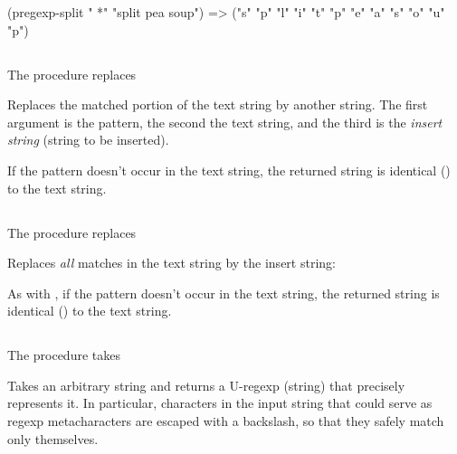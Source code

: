 {{(pregexp-split " *" "split pea     soup")
=> ("s" "p" "l" "i" "t" "p" "e" "a" "s" "o" "u" "p")
}

\subsection{}

\ifx\MzLibManual\Undefined
The procedure  replaces 
\else


Replaces
\fi
the
matched portion of the text string by another
string.  The first argument is the pattern,
the second the text string, and the third
is the {\em insert string} (string to be inserted).


\n If the pattern doesn't occur in the text 
string, the returned string is identical ()
to the text string.

\subsection{}

\ifx\MzLibManual\Undefined
The procedure  replaces 
\else
{}

Replaces
\fi
{\em all} 
matches in the text string by the insert
string:


\n As with , if the pattern doesn't 
occur in the text string, the returned string is
identical () to the text string. 

\subsection{}

\ifx\MzLibManual\Undefined
The procedure  takes
\else
{}

Takes \fi an arbitrary string and returns a U-regexp
(string) that precisely represents it.  In particular,
characters in the input string that could serve as
regexp metacharacters are escaped with a
backslash, so that they safely match only themselves.

}
